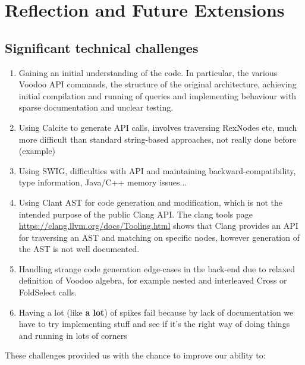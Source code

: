 \chapter{Reflection and Future Extensions}

\section{Significant technical challenges}

\begin{enumerate}
\item Gaining an initial understanding of the code. In particular, the various Voodoo API commands, the structure of the original architecture, achieving initial compilation and running of queries and implementing behaviour with sparse documentation and unclear testing.
\item Using Calcite to generate API calls, involves traversing RexNodes etc, much more difficult than standard string-based approaches, not really done before (example)
\item Using SWIG, difficulties with API and maintaining backward-compatibility, type information, Java/C++ memory issues...
\item Using Clant AST for code generation and modification, which is not the intended purpose of the public Clang API. The clang tools page \url{https://clang.llvm.org/docs/Tooling.html} shows that Clang provides an API for traversing an AST and matching on specific nodes, however generation of the AST is not well documented. 
\item Handling strange code generation edge-cases in the back-end due to relaxed definition of Voodoo algebra, for example nested and interleaved Cross or FoldSelect calls.
\item Having a lot (like \textbf{a lot}) of spikes fail because by lack of documentation we have to try implementing stuff and see if it's the right way of doing things and running in lots of corners
\end{enumerate}

These challenges provided us with the chance to improve our ability to:

